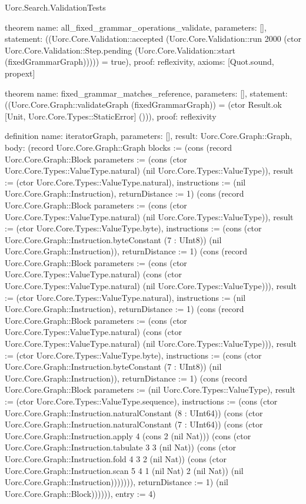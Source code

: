 \begin{lexlean}{Uorc.Search.ValidationTests}
\begin{semanticmodule}
theorem{
  name: all_fixed_grammar_operations_validate,
  parameters: [],
  statement: ((Uorc.Core.Validation::accepted (Uorc.Core.Validation::run 2000 (ctor Uorc.Core.Validation::Step.pending (Uorc.Core.Validation::start (fixedGrammarGraph))))) = true),
  proof: reflexivity{},
  axioms: [Quot.sound, propext]
}

theorem{
  name: fixed_grammar_matches_reference,
  parameters: [],
  statement: ((Uorc.Core.Graph::validateGraph (fixedGrammarGraph)) = (ctor Result.ok [Unit, Uorc.Core.Types::StaticError] ())),
  proof: reflexivity{}
}

definition{
  name: iteratorGraph,
  parameters: [],
  result: Uorc.Core.Graph::Graph,
  body: (record Uorc.Core.Graph::Graph {blocks := (cons (record Uorc.Core.Graph::Block {parameters := (cons (ctor Uorc.Core.Types::ValueType.natural) (nil Uorc.Core.Types::ValueType)), result := (ctor Uorc.Core.Types::ValueType.natural), instructions := (nil Uorc.Core.Graph::Instruction), returnDistance := 1}) (cons (record Uorc.Core.Graph::Block {parameters := (cons (ctor Uorc.Core.Types::ValueType.natural) (nil Uorc.Core.Types::ValueType)), result := (ctor Uorc.Core.Types::ValueType.byte), instructions := (cons (ctor Uorc.Core.Graph::Instruction.byteConstant (7 : UInt8)) (nil Uorc.Core.Graph::Instruction)), returnDistance := 1}) (cons (record Uorc.Core.Graph::Block {parameters := (cons (ctor Uorc.Core.Types::ValueType.natural) (cons (ctor Uorc.Core.Types::ValueType.natural) (nil Uorc.Core.Types::ValueType))), result := (ctor Uorc.Core.Types::ValueType.natural), instructions := (nil Uorc.Core.Graph::Instruction), returnDistance := 1}) (cons (record Uorc.Core.Graph::Block {parameters := (cons (ctor Uorc.Core.Types::ValueType.natural) (cons (ctor Uorc.Core.Types::ValueType.natural) (nil Uorc.Core.Types::ValueType))), result := (ctor Uorc.Core.Types::ValueType.byte), instructions := (cons (ctor Uorc.Core.Graph::Instruction.byteConstant (7 : UInt8)) (nil Uorc.Core.Graph::Instruction)), returnDistance := 1}) (cons (record Uorc.Core.Graph::Block {parameters := (nil Uorc.Core.Types::ValueType), result := (ctor Uorc.Core.Types::ValueType.sequence), instructions := (cons (ctor Uorc.Core.Graph::Instruction.naturalConstant (8 : UInt64)) (cons (ctor Uorc.Core.Graph::Instruction.naturalConstant (7 : UInt64)) (cons (ctor Uorc.Core.Graph::Instruction.apply 4 (cons 2 (nil Nat))) (cons (ctor Uorc.Core.Graph::Instruction.tabulate 3 3 (nil Nat)) (cons (ctor Uorc.Core.Graph::Instruction.fold 4 3 2 (nil Nat)) (cons (ctor Uorc.Core.Graph::Instruction.scan 5 4 1 (nil Nat) 2 (nil Nat)) (nil Uorc.Core.Graph::Instruction))))))), returnDistance := 1}) (nil Uorc.Core.Graph::Block)))))), entry := 4})
}


\end{semanticmodule}
\end{lexlean}
